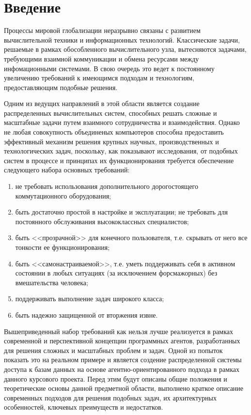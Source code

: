 \updateStamp
{}
\section*{Введение}
Процессы мировой глобализации неразрывно связаны с развитием вычислительной техники и информационных технологий. Классические задачи, решаемые в рамках обособленного вычислительного узла, вытесняются задачами, требующими взаимной коммуникации и обмена ресурсами между инфомационными системами. В свою очередь это ведет к постоянному увеличению требований к имеющимся подходам и технологиям, предоставляющим подобные решения.

Одним из ведущих направлений в этой области является создание распределенных вычислительных систем, способных решать сложные и масштабные задачи путем взаимного сотрудничества и взаимодействия. Однако не любая совокупность объединеных компьютеров способна предоставить эффективный механизм решения крупных научных, производственных и технологических задач, поскольку, как показывают исследования, от подобных систем в процессе и принципах их функционирования требуется обеспечение следующего набора основных требований:

\begin{enumerate}
\item не требовать использования дополнительного дорогостоящего коммутационного оборудования;
\item быть достаточно простой в настройке и эксплуатации; не требовать для постоянного обслуживания высококлассных специалистов;
\item быть <<прозрачной>> для конечного пользователя, т.е. скрывать от него все тонкости ее функционирования;
\item быть <<самонастраиваемой>>, т.е. уметь поддерживать себя в активном состоянии в любых ситуациях (за исключением форсмажорных) без вмешательства человека;
\item поддерживать выполнение задач широкого класса;
\item быть надежно защищенной от вторжения извне.
\end{enumerate}

Вышеприведенный набор требований как нельзя лучше реализуется в рамках современной и перспективной концепции программных агентов, разработанных для решения сложных и масштабных проблем и задач. Одной из попыток показать это на реальном примере и является создение распределенной системы доступа к базам данных на основе агентно-ориентированного подхода в рамках данного курсового проекта. Перед этим будут описаны общие положения и теоретические основы данной предметной области, выполнено краткое описание современных подходов для решения подобных задач, их архитектурных особенностей, ключевых преимуществ и недостатков.

